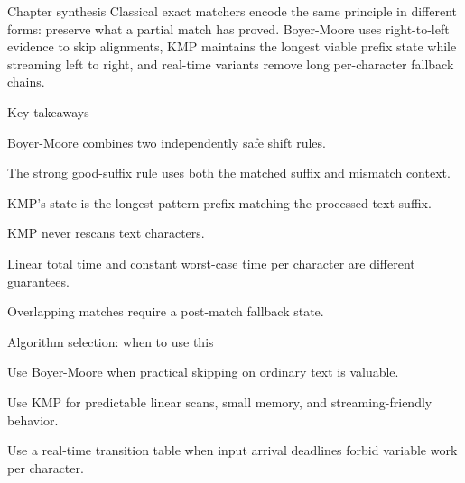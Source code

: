 \documentclass[11pt,letterpaper]{article}
\begin{document}
\begin{CornellNotesTable}
\end{CornellNotesTable}

\begin{CornellSummaryBox}{Chapter synthesis}
Classical exact matchers encode the same principle in different forms: preserve what a partial match has proved. Boyer-Moore uses right-to-left evidence to skip alignments, KMP maintains the longest viable prefix state while streaming left to right, and real-time variants remove long per-character fallback chains.
\end{CornellSummaryBox}

\begin{CornellSummaryBox}{Key takeaways}
\begin{CornellRecallList}
  \item Boyer-Moore combines two independently safe shift rules.
  \item The strong good-suffix rule uses both the matched suffix and mismatch context.
  \item KMP's state is the longest pattern prefix matching the processed-text suffix.
  \item KMP never rescans text characters.
  \item Linear total time and constant worst-case time per character are different guarantees.
  \item Overlapping matches require a post-match fallback state.
\end{CornellRecallList}
\end{CornellSummaryBox}

\begin{CornellOverviewBox}{Algorithm selection: when to use this}
\begin{CornellChecklist}
  \item Use Boyer-Moore when practical skipping on ordinary text is valuable.
  \item Use KMP for predictable linear scans, small memory, and streaming-friendly behavior.
  \item Use a real-time transition table when input arrival deadlines forbid variable work per character.
\end{CornellChecklist}
\end{CornellOverviewBox}
\end{document}
